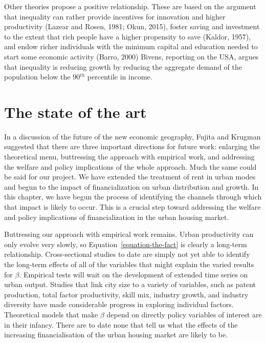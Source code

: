  
 Other theories propose a positive relationship. These are based on the argument that inequality can rather provide incentives for innovation and higher productivity (Lazear and Rosen, 1981; Okun, 2015), foster saving and investment to the extent that rich people have a higher propensity to save (Kaldor, 1957), and endow richer individuals with the minimum capital and education needed to start some economic activity (Barro, 2000)
Bivens, reporting on the USA, argues that inequality is reducing growth by reducing the aggregate demand of the population below the 90$^{th}$ percentile in income.\cite{bivensInequalitySlowingUS2017} 

\section{The state of the art}
In a discussion of the  future of the new economic geography, Fujita and Krugman suggested that there are three important directions for future work: enlarging the theoretical menu, buttressing the approach with empirical work, and addressing the welfare and policy implications of the whole approach. Much the same could be said for our project. We have extended the treatment of rent in urban modes and begun to the impact of financialization on urban distribution and growth. In this chapter, we have begun the process of identifying the channels through which  that impact is likely to occur. This is a crucial step toward  addressing the welfare and policy implications of financialization in the urban housing market.
 
Buttressing our approach with empirical work remains. Urban productivity can only evolve very slowly, so Equation~\ref{equation-the-fact} is clearly a long-term relationship. Cross-sectional studies to date are simply not yet able to identify the long-term effects of all of  the variables that might explain the varied results for  $\beta$. Empirical tests will wait on the development of extended time series on urban output.
Studies that link city size to a variety of variables, such as patent production, total factor productivity, skill mix, industry growth, and industry diversity have made considerable progress in exploring individual factors. Theoretical models that make $\beta$ depend on directly policy variables of interest are in their infancy. There are to date  none that tell us what the effects of the increasing financialisation of the urban housing market are likely to be.  
 


